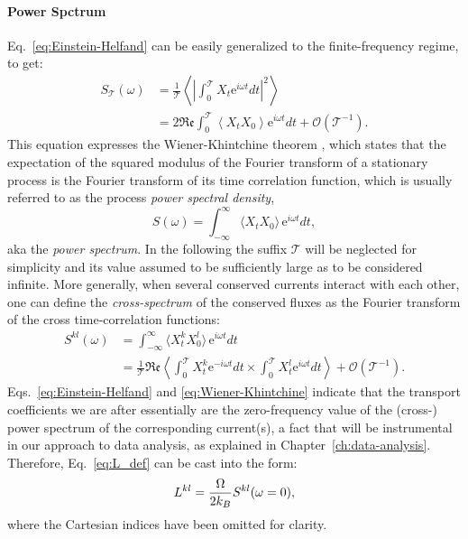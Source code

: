 \paragraph{Power Spctrum}
Eq.~\eqref{eq:Einstein-Helfand} can be easily generalized to the finite-frequency regime, to get:
\begin{equation}
  \begin{aligned}
    S_\mathcal{T}(\omega) &= \frac{1}{\mathcal{T}} \left \langle \left | \int_0^\mathcal{T} X_t \mathrm{e}^{i\omega t}dt \right |^2 \right \rangle \\
    &= 2\mathfrak{Re} \int_0^\mathcal{T} \left \langle X_t X_0 \right \rangle \mathrm{e}^{i\omega t}dt + \mathcal{O}(\mathcal{T}^{-1}).
  \end{aligned}
  \label{eq:Wiener-Khintchine}
\end{equation}
This equation expresses the Wiener-Khintchine theorem \cite{Wiener1930,Khintchine1934}, which states that the expectation of the squared modulus of the Fourier transform of a stationary process is the Fourier transform of its time correlation function, which is usually referred to as the process \emph{power spectral density},
\begin{equation}
  S(\omega) = \int_{-\infty}^\infty \langle X_t X_0 \rangle \,\mathrm{e}^{i\omega t} dt, \label{eq:S(omega)}
\end{equation}
aka the \emph{power spectrum}. In the following the suffix $\mathcal{T}$ will be neglected for simplicity and its value assumed to be sufficiently large as to be considered infinite. More generally, when several conserved currents interact with each other, one can define the \emph{cross-spectrum} of the conserved fluxes as the Fourier transform of the cross time-correlation functions:
\begin{equation}
  \begin{aligned}
    S^{kl}(\omega) &= \int_{-\infty}^\infty \langle X^k_t X^l_0 \rangle \,\mathrm{e}^{i\omega t} dt \\
    &= \frac{1}{\mathcal{T}} \mathfrak{Re} \left\langle \int_0^\mathcal{T} X^k_t \mathrm{e}^{-i\omega t}dt \times \int_0^\mathcal{T} X^l_t \mathrm{e}^{i\omega t}dt \right\rangle + \mathcal{O}(\mathcal{T}^{-1}).
  \end{aligned} \label{eq:Sij(omega)}
\end{equation}
Eqs.~\eqref{eq:Einstein-Helfand} and \eqref{eq:Wiener-Khintchine} indicate that the transport coefficients we are after essentially are the zero-frequency value of the (cross-) power spectrum of the corresponding current(s), a fact that will be instrumental in our approach to data analysis, as explained in Chapter~\ref{ch:data-analysis}. Therefore, Eq.~\eqref{eq:L_def} can be cast into the form:
\begin{equation}
    L^{kl} =\frac{\rOmega}{2 k_B} S^{kl}(\omega=0), \label{eq:GK-S0}
\end{equation}
where the Cartesian indices have been omitted for clarity.


